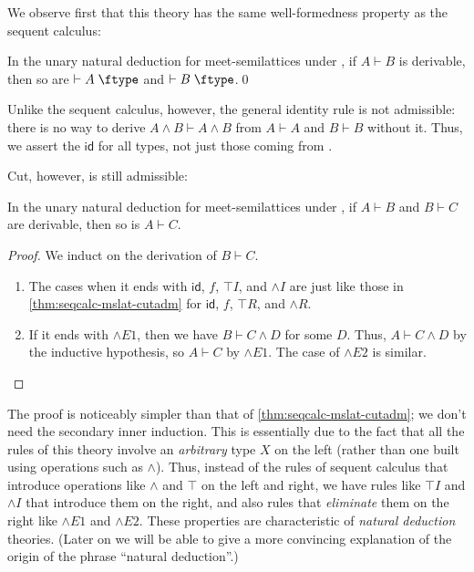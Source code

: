 \documentclass{book}
\def\idfunc{\mathsf{id}}
\let\types\vdash
\def\type{\;\ftype}
\let\meet\wedge
\def\meetR{\mathord{\meet}R}
\def\meetE{\mathord{\meet}E}
\def\meetI{\mathord{\meet}I}
\begin{document}
We observe first that this theory has the same well-formedness property as the sequent calculus:

\begin{thm}\label{thm:natded-mslat-wftype}
  In the unary natural deduction for meet-semilattices under \cG, if $A\types B$ is derivable, then so are $\types A\type$ and $\types B\type$.\qed
\end{thm}

Unlike the sequent calculus, however, the general identity rule is not admissible: there is no way to derive $A\meet B \types A\meet B$ from $A\types A$ and $B\types B$ without it.
Thus, we assert the $\idfunc$ for all types, not just those coming from \cG.

Cut, however, is still admissible:

\begin{thm}\label{thm:natded-mslat-cutadm}
  In the unary natural deduction for meet-semilattices under \cG, if $A\types B$ and $B\types C$ are derivable, then so is $A\types C$.
\end{thm}
\begin{proof}
  We induct on the derivation of $B\types C$.
  \begin{enumerate}
  \item The cases when it ends with $\idfunc$, $f$, $\top I$, and $\meetI$ are just like those in \cref{thm:seqcalc-mslat-cutadm} for $\idfunc$, $f$, $\top R$, and $\meetR$.
  \item If it ends with $\meetE1$, then we have $B\types C\meet D$ for some $D$.
    Thus, $A\types C\meet D$ by the inductive hypothesis, so $A\types C$ by $\meetE1$.
    The case of $\meetE2$ is similar.\qedhere
  \end{enumerate}
\end{proof}

The proof is noticeably simpler than that of \cref{thm:seqcalc-mslat-cutadm}; we don't need the secondary inner induction.
This is essentially due to the fact that all the rules of this theory involve an \emph{arbitrary} type $X$ on the left (rather than one built using operations such as $\meet$).
Thus, instead of the rules of sequent calculus that introduce operations like $\meet$ and $\top$ on the left and right, we have rules like $\top I$ and $\meetI$ that introduce them on the right, and also rules that \emph{eliminate} them on the right like $\meetE1$ and $\meetE2$.
These properties are characteristic of \emph{natural deduction} theories.
(Later on we will be able to give a more convincing explanation of the origin of the phrase ``natural deduction''.)
\end{document}
